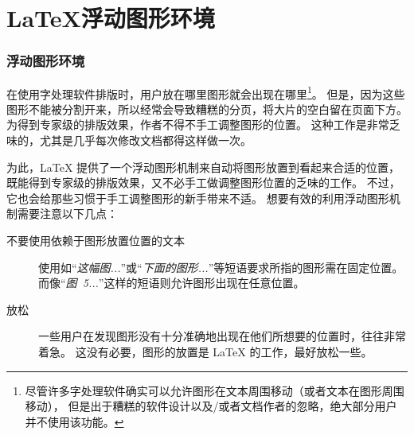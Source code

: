 
\part{\LaTeX{}浮动图形环境}

\section{浮动图形环境}\label{sec:floatfigure}
在使用字处理软件排版时，用户放在哪里图形就会出现在哪里\footnote{
	尽管许多字处理软件确实可以允许图形在文本周围移动（或者文本在图形周围移动），
	但是出于糟糕的软件设计以及/或者文档作者的忽略，绝大部分用户并不使用该功能。}。
但是，因为这些图形不能被分割开来，所以经常会导致糟糕的分页，将大片的空白留在页面下方。
为得到专家级的排版效果，作者不得不手工调整图形的位置。
这种工作是非常乏味的，尤其是几乎每次修改文档都得这样做一次。

为此，\LaTeX{} 提供了一个浮动图形机制来自动将图形放置到看起来合适的位置，
既能得到专家级的排版效果，又不必手工做调整图形位置的乏味的工作。
不过，它也会给那些习惯于手工调整图形的新手带来不适。
想要有效的利用浮动图形机制需要注意以下几点：
\begin{description}
	\item[不要使用依赖于图形放置位置的文本]
	
	使用如“\emph{这幅图...}”或“\emph{下面的图形...}”等短语要求所指的图形需在固定位置。
	而像“\emph{图~5...}”这样的短语则允许图形出现在任意位置。
	\item [放松]
	
	一些用户在发现图形没有十分准确地出现在他们所想要的位置时，往往非常着急。
	这没有必要，图形的放置是 \LaTeX{} 的工作，最好放松一些。
\end{description}

